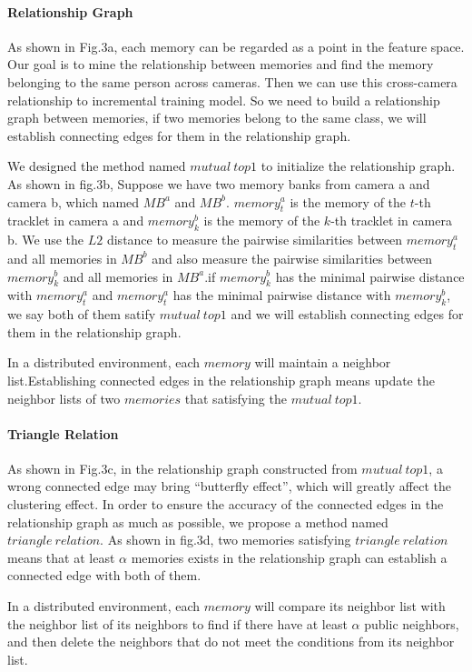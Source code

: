 \documentclass{article}
\begin{document}
\paragraph{Relationship Graph}As shown in Fig.3a, each memory can be regarded as a point in the feature space. Our goal is to mine the relationship between memories and find the memory belonging to the same person across cameras. Then we can use this cross-camera relationship to incremental training model. So we need to build a relationship graph between memories, if two memories belong to the same class, we will establish connecting edges for them in the relationship graph.


We designed the method named $mutual \ top1$ to initialize the relationship graph. As shown in fig.3b, Suppose we have two memory banks from camera a and camera b, which named $MB^{a}$ and $MB^{b}$. $memory_{t}^{a}$ is the memory of the $t$-th tracklet in camera a and $memory_{k}^{b}$ is the memory of the $k$-th tracklet in camera b. We use the $L2$ distance to measure the pairwise similarities between $memory_{t}^{a}$ and all memories in $MB^{b}$ and also measure the pairwise similarities between $memory_{k}^{b}$ and all memories in $MB^{a}$.if $memory_{k}^{b}$ has the  minimal pairwise distance with $memory_{t}^{a}$ and  $memory_{t}^{a}$ has the minimal pairwise distance with $memory_{k}^{b}$, we say both of them satify $mutual \ top1$ and we will establish connecting edges for them in the relationship graph.

In a distributed environment, each $memory$ will maintain a neighbor list.Establishing connected edges in the relationship graph means update the neighbor lists of two $memories$ that satisfying the $mutual \ top1$.

\paragraph{Triangle Relation}As shown in Fig.3c, in the relationship graph constructed from $mutual \ top1$, a wrong connected edge may bring ``butterfly effect'', which will greatly affect the clustering effect. In order to ensure the accuracy of the connected edges in the relationship graph as much as possible, we propose a  method named $triangle \ relation$. As shown in fig.3d, two memories satisfying $triangle \ relation$ means that at least $\alpha$ memories exists in the relationship graph can establish a connected edge with both of them. 


In a distributed environment, each $memory$ will compare its neighbor list with the neighbor list of its neighbors to find if there have at least $\alpha$ public neighbors, and then delete the neighbors that do not meet the conditions from its neighbor list.
\end{document}
